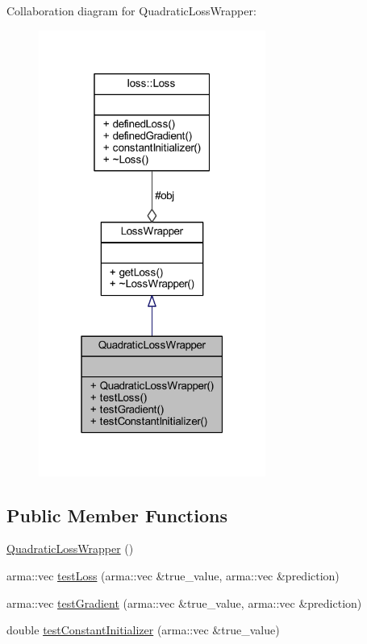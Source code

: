 Collaboration diagram for Quadratic\+Loss\+Wrapper\+:\nopagebreak
\begin{figure}[H]
\begin{center}
\leavevmode
\includegraphics[width=211pt]{class_quadratic_loss_wrapper__coll__graph}
\end{center}
\end{figure}
\subsection*{Public Member Functions}
\begin{DoxyCompactItemize}
\item 
\mbox{\hyperlink{class_quadratic_loss_wrapper_abdf2bc70db2514f8ac3d49563cbf42ec}{Quadratic\+Loss\+Wrapper}} ()
\item 
arma\+::vec \mbox{\hyperlink{class_quadratic_loss_wrapper_a9e179437d5d6cffc4e2eb41cf46a2666}{test\+Loss}} (arma\+::vec \&true\+\_\+value, arma\+::vec \&prediction)
\item 
arma\+::vec \mbox{\hyperlink{class_quadratic_loss_wrapper_a9154647dbe336faf38e0fdfb3f30173d}{test\+Gradient}} (arma\+::vec \&true\+\_\+value, arma\+::vec \&prediction)
\item 
double \mbox{\hyperlink{class_quadratic_loss_wrapper_a0ed64adb364d6c2c1a0795672c7eb53e}{test\+Constant\+Initializer}} (arma\+::vec \&true\+\_\+value)
\end{DoxyCompactItemize}
